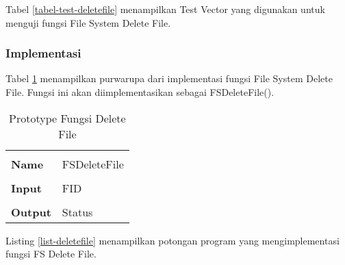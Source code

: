 Tabel \ref{tabel-test-deletefile} menampilkan Test Vector yang digunakan untuk menguji fungsi File System Delete File.

\subsubsection{Implementasi}

Tabel \ref{tabel-deletefile} menampilkan purwarupa dari implementasi fungsi File System Delete File. Fungsi ini akan diimplementasikan sebagai FSDeleteFile().

\begin{table}[hp]
  \centering
  \begin{tabular}{p{2cm} p{8cm}}
    \hline\\
    {\bf Name} & FSDeleteFile\\
    \hline\\
    {\bf Input} & FID
    \\
    \hline\\
    {\bf Output} & Status
    \\
    \hline
  \end{tabular}
  \caption{Prototype Fungsi Delete File}
  \label{tabel-deletefile}
\end{table}

Listing \ref{list-deletefile} menampilkan potongan program yang mengimplementasi fungsi FS Delete File.


